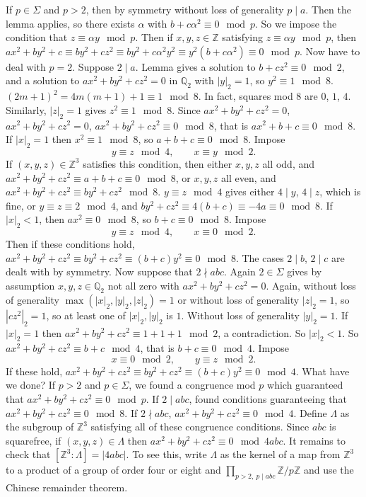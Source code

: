 \documentclass{article}
\newcommand{\Z}{\mathbb{Z}}
\newcommand{\Q}{\mathbb{Q}}
\newcommand{\rb}[1]{\left( #1 \right)}
\renewcommand{\sb}[1]{\left[ #1 \right]}
\newcommand{\abs}[1]{\left\lvert #1 \right\rvert}
\theoremstyle{definition}\newtheorem{definition}{Definition}[section]
\theoremstyle{definition}\newtheorem{remark}[definition]{Remark}
\theoremstyle{definition}\newtheorem*{example}{Example}
\theoremstyle{definition}\newtheorem*{note}{Note}
\begin{document}
If $ p \in \Sigma $ and $ p > 2 $, then by symmetry without loss of generality $ p \mid a $. Then the lemma applies, so there exists $ \alpha $ with $ b + c\alpha^2 \equiv 0 \mod p $. So we impose the condition that $ z \equiv \alpha y \mod p $. Then if $ x, y, z \in \Z $ satisfying $ z \equiv \alpha y \mod p $, then $ ax^2 + by^2 + c \equiv by^2 + cz^2 \equiv by^2 + c\alpha^2y^2 \equiv y^2\rb{b + c\alpha^2} \equiv 0 \mod p $. Now have to deal with $ p = 2 $. Suppose $ 2 \mid a $. Lemma gives a solution to $ b + cz^2 \equiv 0 \mod 2 $, and a solution to $ ax^2 + by^2 + cz^2 = 0 $ in $ \Q_2 $ with $ \abs{y}_2 = 1 $, so $ y^2 \equiv 1 \mod 8 $. $ \rb{2m + 1}^2 = 4m\rb{m + 1} + 1 \equiv 1 \mod 8 $. In fact, squares mod $ 8 $ are $ 0 $, $ 1 $, $ 4 $. Similarly, $ \abs{z}_2 = 1 $ gives $ z^2 \equiv 1 \mod 8 $. Since $ ax^2 + by^2 + cz^2 = 0 $, $ ax^2 + by^2 + cz^2 = 0 $, $ ax^2 + by^2 + cz^2 \equiv 0 \mod 8 $, that is $ ax^2 + b + c \equiv 0 \mod 8 $. If $ \abs{x}_2 = 1 $ then $ x^2 \equiv 1 \mod 8 $, so $ a + b + c \equiv 0 \mod 8 $. Impose
$$ y \equiv z \mod 4, \qquad x \equiv y \mod 2. $$
If $ \rb{x, y, z} \in \Z^3 $ satisfies this condition, then either $ x, y, z $ all odd, and $ ax^2 + by^2 + cz^2 \equiv a + b + c \equiv 0 \mod 8 $, or $ x, y, z $ all even, and $ ax^2 + by^2 + cz^2 \equiv by^2 + cz^2 \mod 8 $. $ y \equiv z \mod 4 $ gives either $ 4 \mid y $, $ 4 \mid z $, which is fine, or $ y \equiv z \equiv 2 \mod 4 $, and $ by^2 + cz^2 \equiv 4\rb{b + c} \equiv -4a \equiv 0 \mod 8 $. If $ \abs{x}_2 < 1 $, then $ ax^2 \equiv 0 \mod 8 $, so $ b + c \equiv 0 \mod 8 $. Impose
$$ y \equiv z \mod 4, \qquad x \equiv 0 \mod 2. $$
Then if these conditions hold, $ ax^2 + by^2 + cz^2 \equiv by^2 + cz^2 \equiv \rb{b + c}y^2 \equiv 0 \mod 8 $. The cases $ 2 \mid b $, $ 2 \mid c $ are dealt with by symmetry. Now suppose that $ 2 \nmid abc $. Again $ 2 \in \Sigma $ gives by assumption $ x, y, z \in \Q_2 $ not all zero with $ ax^2 + by^2 + cz^2 = 0 $. Again, without loss of generality $ \max\rb{\abs{x}_2, \abs{y}_2, \abs{z}_2} = 1 $ or without loss of generality $ \abs{z}_2 = 1 $, so $ \abs{cz^2}_2 = 1 $, so at least one of $ \abs{x}_2, \abs{y}_2 $ is $ 1 $. Without loss of generality $ \abs{y}_2 = 1 $. If $ \abs{x}_2 = 1 $ then $ ax^2 + by^2 + cz^2 \equiv 1 + 1 + 1 \mod 2 $, a contradiction. So $ \abs{x}_2 < 1 $. So $ ax^2 + by^2 + cz^2 \equiv b + c \mod 4 $, that is $ b + c \equiv 0 \mod 4 $. Impose
$$ x \equiv 0 \mod 2, \qquad y \equiv z \mod 2. $$
If these hold, $ ax^2 + by^2 + cz^2 \equiv by^2 + cz^2 \equiv \rb{b + c}y^2 \equiv 0 \mod 4 $. What have we done? If $ p > 2 $ and $ p \in \Sigma $, we found a congruence mod $ p $ which guaranteed that $ ax^2 + by^2 + cz^2 \equiv 0 \mod p $. If $ 2 \mid abc $, found conditions guaranteeing that $ ax^2 + by^2 + cz^2 \equiv 0 \mod 8 $. If $ 2 \nmid abc $, $ ax^2 + by^2 + cz^2 \equiv 0 \mod 4 $. Define $ \Lambda $ as the subgroup of $ \Z^3 $ satisfying all of these congruence conditions. Since $ abc $ is squarefree, if $ \rb{x, y, z} \in \Lambda $ then $ ax^2 + by^2 + cz^2 \equiv 0 \mod 4abc $. It remains to check that $ \sb{\Z^3 : \Lambda} = \abs{4abc} $. To see this, write $ \Lambda $ as the kernel of a map from $ \Z^3 $ to a product of a group of order four or eight and $ \prod_{p > 2, \ p \mid abc} \Z / p\Z $ and use the Chinese remainder theorem.
\end{document}
